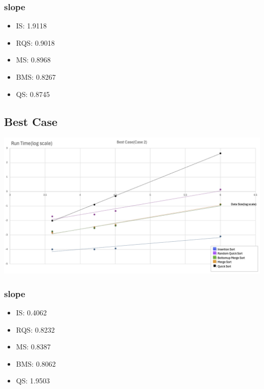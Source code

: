 \documentclass[11pt]{article}
\theoremstyle{definition}
\begin{document}
\subsubsection*{slope}
\begin{itemize}
  \item IS: 1.9118
  \item RQS: 0.9018
  \item MS: 0.8968 
  \item BMS: 0.8267
  \item QS: 0.8745
\end{itemize}
\subsection*{Best Case}
\includegraphics[width = \textwidth]{Chart 2.png}
\subsubsection*{slope}
\begin{itemize}
  \item IS: 0.4062
  \item RQS: 0.8232
  \item MS: 0.8387 
  \item BMS: 0.8062
  \item QS: 1.9503
\end{itemize}
\end{document}
